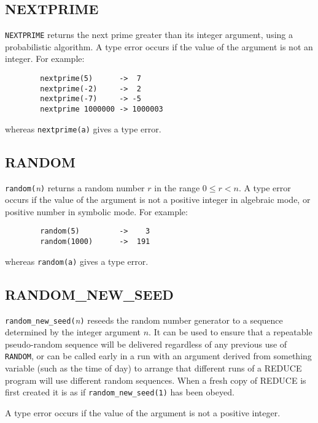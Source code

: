 \subsection{NEXTPRIME}
\hypertarget{operator:NEXTPRIME}{}

\texttt{NEXTPRIME} returns the next prime greater than its integer argument,
using a probabilistic algorithm.  A type error occurs if the value of the
argument is not an integer.  For example:
\begin{verbatim}
        nextprime(5)      ->  7
        nextprime(-2)     ->  2
        nextprime(-7)     -> -5
        nextprime 1000000 -> 1000003
\end{verbatim}
whereas \texttt{nextprime(a)} gives a type error.

\subsection{RANDOM}
\hypertarget{operator:RANDOM}{}

\texttt{random(}{\em n\/}\texttt{)} returns a random number $r$ in the
range $0\leq r < n$.  A type error occurs if the value of the argument is not a
positive integer in algebraic mode, or positive number in symbolic mode.
For example:
\begin{verbatim}
        random(5)         ->    3
        random(1000)      ->  191
\end{verbatim}
whereas \texttt{random(a)} gives a type error.

\subsection{RANDOM\_NEW\_SEED}
\hypertarget{operator:RANDOM_NEW_SEED}{}

\texttt{random\_new\_seed(}\emph{n}\texttt{)} reseeds the random number
generator
to a sequence determined by the integer argument $n$.  It can be used to
ensure that a repeatable pseudo-random sequence will be delivered
regardless of any previous use of \texttt{RANDOM}, or can be called early in
a run with an argument derived from something variable (such as the time
of day) to arrange that different runs of a REDUCE program will use
different random sequences.  When a fresh copy of REDUCE is first created
it is as if \texttt{random\_new\_seed(1)} has been obeyed.

A type error occurs if the value of the argument is not a positive integer.

